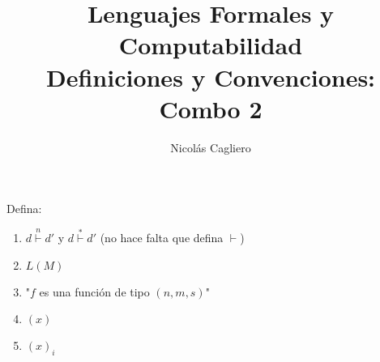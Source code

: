 \documentclass{article}
\title{Lenguajes Formales y Computabilidad \\
        \large Definiciones y Convenciones: Combo 2 }
\author{Nicolás Cagliero}
\begin{document}
\maketitle

Defina:
\begin{enumerate}
    \item $d \overset{n}{\vdash} d'$ y $d \overset{*}{\vdash} d'$
            (no hace falta que defina $\vdash$)

    \item $L(M)$
    
    \item "$f$ es una función de tipo $(n, m, s)$"
    
    \item $(x)$
    
    \item $(x)_i$
\end{enumerate}
\end{document}
